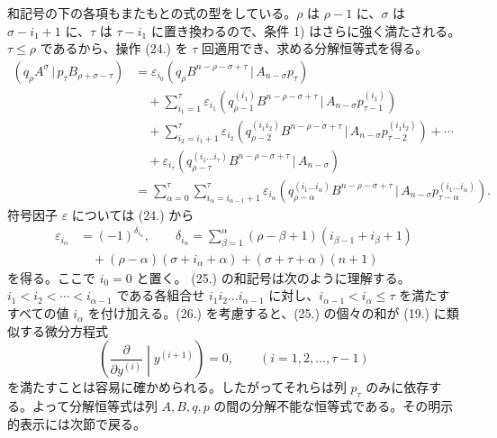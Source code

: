 \documentclass[11pt]{jlreq}
\newcommand{\pair}[2]{(#1\,|\,#2)}
\newcommand{\eps}{\varepsilon}
\begin{document}
和記号の下の各項もまたもとの式の型をしている。$\rho$ は $\rho-1$ に、$\sigma$ は $\sigma-i_1+1$ に、$\tau$ は $\tau-i_1$ に置き換わるので、条件 1) はさらに強く満たされる。$\tau\le\rho$ であるから、操作 (24.) を $\tau$ 回適用でき、求める分解恒等式を得る。
\begin{equation}
\begin{aligned}
\pair{q_\rho A^\sigma}{p_\tau B_{\rho+\sigma-\tau}}
&=\eps_{i_0}\pair{q_\rho B^{n-\rho-\sigma+\tau}}{A_{n-\sigma}p_\tau}\\
&\quad+\sum_{i_1=1}^{\tau}\eps_{i_1}
 \pair{q_{\rho-1}^{(i_1)}B^{n-\rho-\sigma+\tau}}{A_{n-\sigma}p_{\tau-1}^{(i_1)}}\\
&\quad+\sum_{i_2=i_1+1}^{\tau}\eps_{i_2}
 \pair{q_{\rho-2}^{(i_1i_2)}B^{n-\rho-\sigma+\tau}}{A_{n-\sigma}p_{\tau-2}^{(i_1i_2)}}+\cdots\\
&\quad+\eps_{i_\tau}\pair{q_{\rho-\tau}^{(i_1\ldots i_\tau)}B^{n-\rho-\sigma+\tau}}{A_{n-\sigma}}\\
&=\sum_{\alpha=0}^{\tau}\sum_{i_\alpha=i_{\alpha-1}+1}^{\tau}\eps_{i_\alpha}
 \pair{q_{\rho-\alpha}^{(i_1\ldots i_\alpha)}B^{n-\rho-\sigma+\tau}}{A_{n-\sigma}p_{\tau-\alpha}^{(i_1\ldots i_\alpha)}}.
\end{aligned}
\tag{25}
\end{equation}
符号因子 $\eps$ については (24.) から
\begin{equation}
\begin{aligned}
\eps_{i_\alpha}&=(-1)^{\delta_{i_\alpha}},\qquad
\delta_{i_\alpha}=\sum_{\beta=1}^{\alpha}(\rho-\beta+1)(i_{\beta-1}+i_\beta+1)\\
&\quad +(\rho-\alpha)(\sigma+i_\alpha+\alpha)+(\sigma+\tau+\alpha)(n+1)
\end{aligned}
\tag{26}
\end{equation}
を得る。ここで $i_0=0$ と置く。 (25.) の和記号は次のように理解する。$i_1<i_2<\cdots<i_{\alpha-1}$ である各組合せ $i_1i_2\ldots i_{\alpha-1}$ に対し、$i_{\alpha-1}<i_\alpha\le\tau$ を満たすすべての値 $i_\alpha$ を付け加える。(26.) を考慮すると、(25.) の個々の和が (19.) に類似する微分方程式
\begin{equation}
 \left(\frac{\partial}{\partial y^{(i)}}\middle|y^{(i+1)}\right)=0,
 \qquad (i=1,2,\ldots,\tau-1)
\tag{27}
\end{equation}
を満たすことは容易に確かめられる。したがってそれらは列 $p_\tau$ のみに依存する。よって分解恒等式は列 $A,B,q,p$ の間の分解不能な恒等式である。その明示的表示には次節で戻る。
\end{document}
